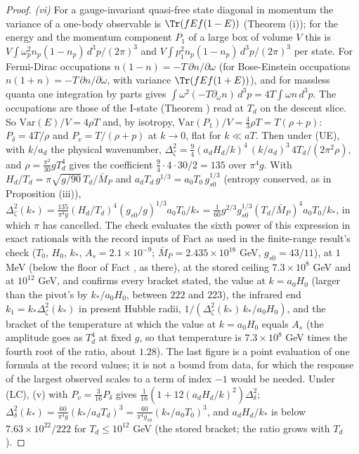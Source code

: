 \begin{proof}
\emph{(vi)} For a gauge-invariant quasi-free state diagonal in momentum the variance of a one-body observable is $\Tr(fEf(1 - E))$ (Theorem (i)); for the energy and the momentum component $P_{1}$ of a large box of volume $V$ this is $V\int\omega_{p}^{2}n_{p}(1 - n_{p})\,d^{3}p/(2\pi)^{3}$ and $V\int p_{1}^{2}n_{p}(1 - n_{p})\,d^{3}p/(2\pi)^{3}$ per state. For Fermi-Dirac occupations $n(1 - n) = -T\,\partial n/\partial\omega$ (for Bose-Einstein occupations $n(1 + n) = -T\,\partial n/\partial\omega$, with variance $\Tr(fEf(1 + E))$), and for massless quanta one integration by parts gives $\int\omega^{2}(-T\partial_{\omega}n)\,d^{3}p = 4T\int\omega n\,d^{3}p$. The occupations are those of the I-state (Theorem ) read at $T_{d}$ on the descent slice. So $\mathrm{Var}(E)/V = 4\rho T$ and, by isotropy, $\mathrm{Var}(P_{1})/V = \tfrac43\rho T = T(\rho + p)$: $P_{\delta} = 4T/\rho$ and $P_{v} = T/(\rho + p)$ at $k \to 0$, flat for $k \ll aT$. Then under (UE), with $k/a_{d}$ the physical wavenumber, $\Delta^{2}_{\zeta} = \tfrac94(a_{d}H_{d}/k)^{4}\,(k/a_{d})^{3}\,4T_{d}/(2\pi^{2}\rho)$, and $\rho = \tfrac{\pi^{2}}{30}gT_{d}^{4}$ gives the coefficient $\tfrac94\cdot4\cdot30/2 = 135$ over $\pi^{4}g$. With $H_{d}/T_{d} = \pi\sqrt{g/90}\,T_{d}/\bar M_{P}$ and $a_{d}T_{d}\,g^{1/3} = a_{0}T_{0}\,g_{s0}^{1/3}$ (entropy conserved, as in Proposition (iii)), $\Delta^{2}_{\zeta}(k_{*}) = \tfrac{135}{\pi^{4}g}(H_{d}/T_{d})^{4}(g_{s0}/g)^{1/3}a_{0}T_{0}/k_{*} = \tfrac{1}{60}g^{2/3}g_{s0}^{1/3}(T_{d}/\bar M_{P})^{4}a_{0}T_{0}/k_{*}$, in which $\pi$ has cancelled. The check evaluates the sixth power of this expression in exact rationals with the record inputs of Fact  as used in the finite-range result's check ($T_{0}$, $H_{0}$, $k_{*}$, $A_{s} = 2.1 \times 10^{-9}$; $\bar M_{P} = 2.435 \times 10^{18}$ GeV, $g_{s0} = 43/11$), at $1$ MeV (below the floor of Fact , as there), at the stored ceiling $7.3 \times 10^{8}$ GeV and at $10^{12}$ GeV, and confirms every bracket stated, the value at $k = a_{0}H_{0}$ (larger than the pivot's by $k_{*}/a_{0}H_{0}$, between $222$ and $223$), the infrared end $k_{1} = k_{*}\Delta^{2}_{\zeta}(k_{*})$ in present Hubble radii, $1/(\Delta^{2}_{\zeta}(k_{*})\,k_{*}/a_{0}H_{0})$, and the bracket of the temperature at which the value at $k = a_{0}H_{0}$ equals $A_{s}$ (the amplitude goes as $T_{d}^{4}$ at fixed $g$, so that temperature is $7.3 \times 10^{8}$ GeV times the fourth root of the ratio, about $1.28$). The last figure is a point evaluation of one formula at the record values; it is not a bound from data, for which the response of the largest observed scales to a term of index $-1$ would be needed. Under (LC), (v) with $P_{v} = \tfrac{3}{16}P_{\delta}$ gives $\tfrac1{16}(1 + 12(a_{d}H_{d}/k)^{2})\Delta^{2}_{\delta}$; $\Delta^{2}_{\delta}(k_{*}) = \tfrac{60}{\pi^{4}g}(k_{*}/a_{d}T_{d})^{3} = \tfrac{60}{\pi^{4}g_{s0}}(k_{*}/a_{0}T_{0})^{3}$, and $a_{d}H_{d}/k_{*}$ is below $7.63 \times 10^{22}/222$ for $T_{d} \le 10^{12}$ GeV (the stored bracket; the ratio grows with $T_{d}$).


\end{proof}

